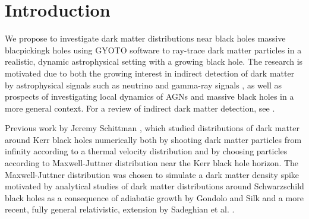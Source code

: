 \documentclass[a4paper,10pt]{article}
\title{}
\author{}
\begin{document}
\maketitle





\begin{abstract}

\end{abstract}

\section{Introduction}


We propose to investigate dark matter distributions near black holes 
massive blacpickingk holes using GYOTO software to ray-trace dark matter 
particles in a realistic, dynamic astrophysical setting with a 
growing black hole. The 
research is motivated due to both the growing interest in indirect 
detection of dark matter by astrophysical signals such as 
neutrino and gamma-ray signals \citep{GS_neutrino_search} 
\citep{indirect_detection_of_dm}, as well as prospects of investigating 
local dynamics of AGNs and massive black holes in a more general 
context. For a review of indirect dark matter detection, see 
\citep{indirect_detection_review}.

Previous work by Jeremy Schittman 
\citep{schnittman2015}, which studied distributions of dark matter 
around Kerr black holes numerically both by shooting dark matter particles 
from infinity according to a thermal velocity distribution and by 
choosing particles according to Maxwell-Juttner distribution near the 
Kerr black hole horizon. The Maxwell-Juttner distribution was 
chosen to simulate a dark matter density spike motivated by analytical 
studies of dark matter distributions around Schwarzschild black holes 
as a consequence of adiabatic growth 
by Gondolo and Silk \citep{GS_2009} 
and a more recent, fully general relativistic, extension by Sadeghian et al. 
\citep{Laleh_GR_DM_distributions}.
\end{document}
